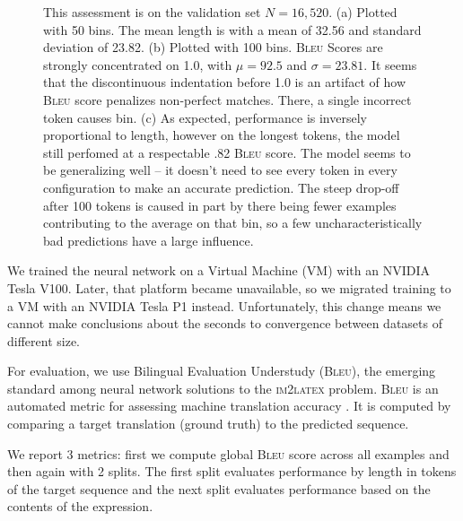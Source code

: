 \documentclass[12pt]{article}
\newcommand{\BLEU}{\textsc{Bleu}}
\begin{document}
\begin{figure}[!h]
\begin{subfigure}{1.0\textwidth}
		\caption{}
	\end{subfigure}
  \caption[Model]{This assessment is on the validation set $N=16,520$. (a)
  Plotted with 50 bins. The mean length is with a mean of  32.56 and standard
  deviation of 23.82. (b) Plotted with 100 bins. \BLEU{} Scores are strongly
  concentrated on 1.0, with $\mu = 92.5$ and $\sigma = 23.81$. It seems that the
  discontinuous indentation before 1.0 is an artifact of how \BLEU{} score
  penalizes non-perfect matches. There, a single incorrect token causes bin. (c)
  As expected, performance is inversely proportional to length, however on the
  longest tokens, the model still perfomed at a respectable .82 \BLEU{} score.
  The model seems to be generalizing well -- it doesn't need to see every token
  in every configuration to make an accurate prediction. The steep drop-off
  after 100 tokens is caused in part by there being fewer examples contributing
  to the average on that bin, so a few uncharacteristically bad predictions have
  a large influence. } 
\end{figure}

We trained the neural network on a Virtual Machine (VM) with an NVIDIA Tesla
V100. Later, that platform became unavailable, so we migrated training to a VM
with an NVIDIA Tesla P1 instead. Unfortunately, this change means we cannot make
conclusions about the seconds to convergence between datasets of different size.

For evaluation, we use Bilingual Evaluation Understudy (\BLEU{}), the emerging
standard among neural network solutions to the \textsc{im2latex} problem. \BLEU{}
is an automated metric for assessing machine translation accuracy
\cite[1]{papineni2002bleu}. It is computed by comparing a target translation
(ground truth) to the predicted sequence.

We report 3 metrics: first we compute global \BLEU{} score across all examples and
then again with 2 splits. The first split evaluates performance by length in
tokens of the target sequence and the next split evaluates performance based on
the contents of the expression.
\end{document}
